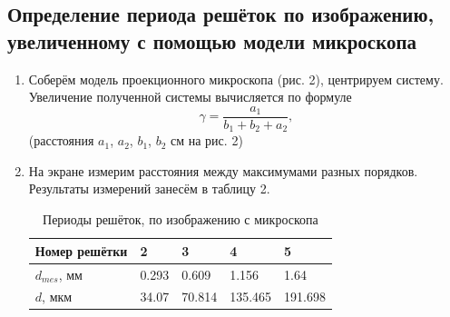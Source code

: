 \documentclass[a4paper]{article}
\begin{document}
\subsection{Определение периода решёток по изображению, увеличенному
с помощью модели микроскопа}
\begin{enumerate}
    \item Соберём модель проекционного микроскопа (рис. 2), центрируем систему. Увеличение полученной системы вычисляется по формуле
    \begin{equation}
        \gamma = \frac{a_1}{b_1+b_2+a_2},
    \end{equation}
    (расстояния $a_1$, $a_2$, $b_1$, $b_2$ см на рис. 2)
    \item На экране измерим расстояния между максимумами разных порядков. Результаты измерений занесём в таблицу 2.
    
        \begin{table}[h]
    \centering
    \begin{center}
    \caption{Периоды решёток, по изображению с микроскопа}
    \end{center}
    \vspace{0.1cm}
    \label{tab:my_label}
    \begin{tabular}{ |p{2.5cm}||p{1cm}|p{1cm}|p{1cm}|p{1cm}|}
 \hline
Номер решётки & 2 & 3 & 4 & 5\\
 \hline
 $d_{mes}$, мм & 0.293 & 0.609 & 1.156 & 1.64 \\
 \hline
 $d$, мкм & 34.07 & 70.814 & 135.465 & 191.698 \\

 \hline
 
\end{tabular}
\end{table}

\end{enumerate}
\end{document}
